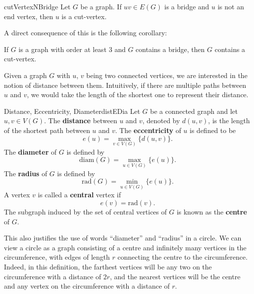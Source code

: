 \documentclass[math, code]{amznotes}
\theoremstyle{remark}
\begin{document}
\begin{probox}{}{cutVertexNBridge}
    Let $G$ be a graph. If $uv \in E(G)$ is a bridge and $u$ is not an end vertex, then $u$ is a cut-vertex.
\end{probox}
A direct consequence of this is the following corollary:
\begin{corbox}{}{}
    If $G$ is a graph with order at least $3$ and $G$ contains a bridge, then $G$ contains a cut-vertex.
\end{corbox}
Given a graph $G$ with $u$, $v$ being two connected vertices, we are interested in the notion of distance between them. Intuitively, if there are multiple paths between $u$ and $v$, we would take the length of the shortest one to represent their distance.
\begin{dfnbox}{Distance, Eccentricity, Diameter}{distEDia}
    Let $G$ be a connected graph and let $u, v \in V(G)$. The {\color{red} \textbf{distance}} between $u$ and $v$, denoted by $d(u, v)$, is the length of the shortest path between $u$ and $v$. The {\color{red} \textbf{eccentricity}} of $u$ is defined to be
    \begin{equation*}
        e(u) = \max_{v \in V(G)}\{d(u, v)\}.
    \end{equation*}
    The {\color{red} \textbf{diameter}} of $G$ is defined by
    \begin{equation*}
        \mathrm{diam}(G) = \max_{u \in V(G)}\{e(u)\}.
    \end{equation*}
    The {\color{red} \textbf{radius}} of $G$ is defined by
    \begin{equation*}
        \mathrm{rad}(G) = \min_{u \in V(G)}\{e(u)\}.
    \end{equation*}
    A vertex $v$ is called a {\color{red} \textbf{central}} vertex if
    \begin{equation*}
        e(v) = \mathrm{rad}(v).
    \end{equation*}
    The subgraph induced by the set of central vertices of $G$ is known as the {\color{red} \textbf{centre}} of $G$.
\end{dfnbox}
This also justifies the use of words ``diameter'' and ``radius'' in a circle. We can view a circle as a graph consisting of a centre and infinitely many vertices in the circumference, with edges of length $r$ connecting the centre to the circumference. Indeed, in this definition, the farthest vertices will be any two on the circumference with a distance of $2r$, and the nearest vertices will be the centre and any vertex on the circumference with a distance of $r$.
\end{document}
